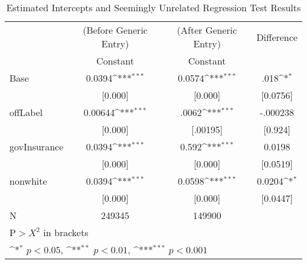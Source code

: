\begin{table}[htbp]\centering
\def\sym#1{\ifmmode^{#1}\else\(^{#1}\)\fi}
\caption{Estimated Intercepts and Seemingly Unrelated Regression Test Results\label{tab1}}
\begin{tabular}{l*{3}{c}}
\hline\hline
            &\multicolumn{1}{c}{(Before Generic Entry)}&\multicolumn{1}{c}{(After Generic Entry)}&\multicolumn{1}{c}{Difference}\\
            &\multicolumn{1}{c}{Constant}&\multicolumn{1}{c}{Constant}&\multicolumn{1}{c}{}\\
\hline
Base&   0.0394\sym{***}&   0.0574\sym{***}&   .018\sym{*}\\
            &     [0.000]         &     [0.000]         &     [0.0756]       \\
[1em]
offLabel    &     0.00644\sym{***}&     .0062\sym{***}&   -.000238\\
            &    [0.000]         &    [.00195]         &    [0.924]         \\
[1em]
govInsurance&    0.0394\sym{***}         &     0.592\sym{***} &   0.0198\\
            &      [0.000]         &      [0.000]        &    [0.0519]         \\
[1em]
nonwhite    &  0.0394\sym{***}         &     0.0598\sym{***}&   0.0204\sym{*}\\
            &     [0.000]        &      [0.000]         &    [0.0447]         \\
\hline
N           &      249345         &      149900\\
\hline\hline
\multicolumn{3}{l}{\footnotesize $\text{P}> X^2$ in brackets}\\
\multicolumn{3}{l}{\footnotesize \sym{*} \(p<0.05\), \sym{**} \(p<0.01\), \sym{***} \(p<0.001\)}\\
\end{tabular}
\end{table}
